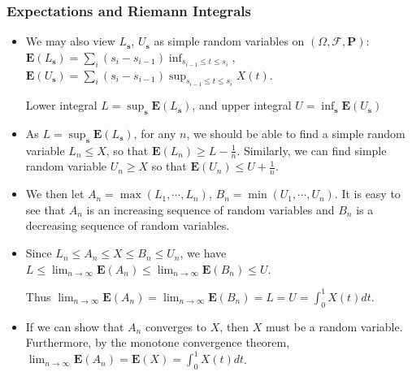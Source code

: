 \documentclass[handout]{beamer}
\newcommand{\BP}{\mathbf{P}}
\newcommand{\BE}{\mathbf{E}}
\begin{document}
\frame
{
  \frametitle{Expectations and Riemann Integrals}

   \begin{itemize}

    \item<1-> We may also view $L_{\mathbf{s}}$, $U_{\mathbf{s}}$ as simple random variables on $(\Omega, \mathcal{F}, \BP)$: $\BE(L_{\mathbf{s}})=\sum_{i} (s_i-s_{i-1}) \inf_{s_{i-1} \le t \le s_i}$, $\BE(U_{\mathbf{s}})=\sum_{i} (s_i-s_{i-1}) \sup_{s_{i-1} \le t \le s_i} X(t)$. 
    
    Lower integral $L=\sup_{\mathbf{s}} \BE(L_{\mathbf{s}})$, and upper integral $U=\inf_{\mathbf{s}} \BE(U_{\mathbf{s}})$
    
     
   \item<2-> As $L=\sup_{\mathbf{s}} \BE(L_{\mathbf{s}})$, for any $n$, we should be able to find a simple random variable $L_n\leq X$, so that $\BE(L_n)\geq L-\frac{1}{n}$. Similarly, we can find simple random variable $U_n \geq X$ so that $\BE(U_n)\leq U+\frac{1}{n}.$
   

   \item<3-> We then let $A_n=\max (L_1, \cdots, L_n)$, $B_n=\min (U_1, \cdots, U_n)$. It is easy to see that $A_n$ is an increasing sequence of random variables and $B_n$ is a decreasing sequence of random variables. 
   
   \item<4-> Since $L_n\leq A_n\leq X\leq B_n \leq U_n$,  we have $L\leq \lim_{n\rightarrow \infty} \BE(A_n)\leq \lim_{n\rightarrow \infty} \BE(B_n)\leq U$. 
   
   Thus $\lim_{n\rightarrow \infty} \BE(A_n)=\lim_{n\rightarrow \infty} \BE(B_n)=L=U=\int_{0}^1 X(t) dt.$
   
    \item<5-> If we can show that $A_n$ converges to $X$, then $X$ must be a random variable. Furthermore, by the monotone convergence theorem, $\lim_{n\rightarrow \infty} \BE(A_n)=\BE(X)= \int_{0}^1 X(t) dt$.     
   

\end{itemize}
}
\end{document}
